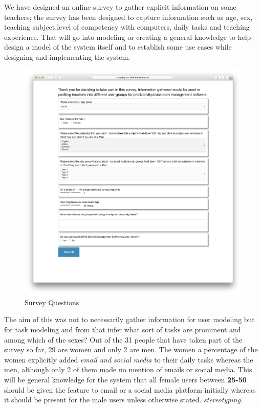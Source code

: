 We have designed an online survey\cite{website:UserSurvey} to gather explicit information on some teachers; the survey has been designed to capture information such as age, sex, teaching subject,level of competency with computers, daily tasks and teaching experience. That will go into modeling or creating a general knowledge to help design a model of the system itself and to establish some use cases while designing and implementing the system.
\begin{figure}[!ht]
    \caption{Survey Questions}
    \label{fig:survey}
    \centering
    \includegraphics[scale=0.1]{figures/survey_shot}
\end{figure}

The aim of this was not to necessarily gather information for user modeling but for task modeling and from that infer what sort of tasks are prominent and among which of the sexes? Out of the 31 people that have taken part of the survey so far, 29 are women and only 2 are men. The women a percentage of the women explicitly added \emph{email and social media} to their daily tasks whereas the men, although only 2 of them made no mention of emails or social media. This will be general knowledge for the system that all female users between \textbf{25-50} should be given the feature to email or a social media platform initially whereas it should be present for the male users unless otherwise stated. \emph{stereotyping}.

